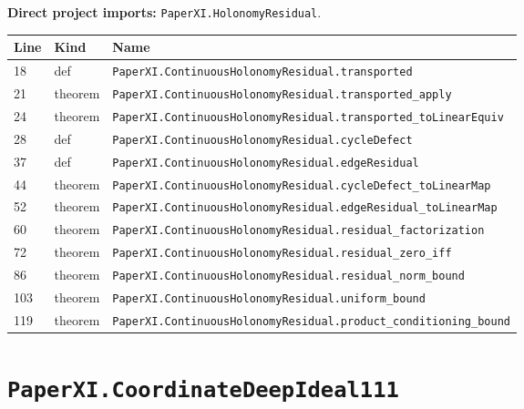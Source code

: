 \documentclass[10pt,oneside]{book}
\begin{document}
\textbf{Direct project imports:} \nolinkurl{PaperXI.HolonomyResidual}.

\begin{longtable}{@{}p{}p{}p{}@{}}\toprule Line&Kind&Name\\\midrule\endhead

18&def&\nolinkurl{PaperXI.ContinuousHolonomyResidual.transported}\\

21&theorem&\nolinkurl{PaperXI.ContinuousHolonomyResidual.transported_apply}\\

24&theorem&\nolinkurl{PaperXI.ContinuousHolonomyResidual.transported_toLinearEquiv}\\

28&def&\nolinkurl{PaperXI.ContinuousHolonomyResidual.cycleDefect}\\

37&def&\nolinkurl{PaperXI.ContinuousHolonomyResidual.edgeResidual}\\

44&theorem&\nolinkurl{PaperXI.ContinuousHolonomyResidual.cycleDefect_toLinearMap}\\

52&theorem&\nolinkurl{PaperXI.ContinuousHolonomyResidual.edgeResidual_toLinearMap}\\

60&theorem&\nolinkurl{PaperXI.ContinuousHolonomyResidual.residual_factorization}\\

72&theorem&\nolinkurl{PaperXI.ContinuousHolonomyResidual.residual_zero_iff}\\

86&theorem&\nolinkurl{PaperXI.ContinuousHolonomyResidual.residual_norm_bound}\\

103&theorem&\nolinkurl{PaperXI.ContinuousHolonomyResidual.uniform_bound}\\

119&theorem&\nolinkurl{PaperXI.ContinuousHolonomyResidual.product_conditioning_bound}\\

\bottomrule\end{longtable}

\section{\texorpdfstring{\nolinkurl{PaperXI.CoordinateDeepIdeal111}}{PaperXI.CoordinateDeepIdeal111}}\label{module:PaperXI.CoordinateDeepIdeal111}
\end{document}
